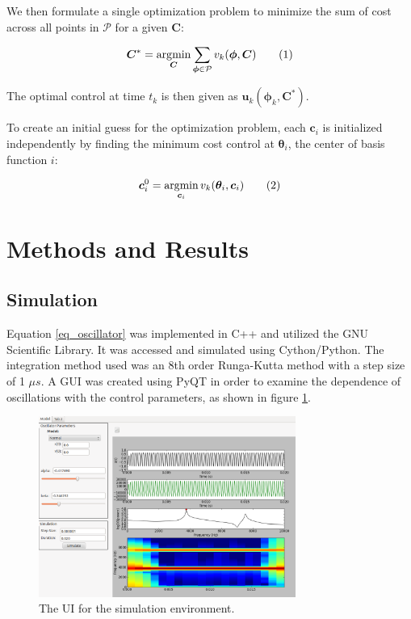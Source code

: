 \documentclass{article} %
\newcommand\numberthis{\addtocounter{equation}{1}\tag{\theequation}}
\DeclareMathOperator*{\argmin}{\arg\!\min}
\begin{document}
We then formulate a single optimization problem to minimize the sum of cost
across all points in $\mathcal{P}$ for a given $\bm{C}$:

\begin{align*}
\bm{C}^* = \argmin_{\bm{C}} \sum_{\bm{\phi} \in \mathcal{P}} v_k( \bm{\phi}, \bm{C} )  \numberthis \label{eq_cstar}
\end{align*}

The optimal control at time $t_k$ is then given as $\bm{u}_k(\bm{\phi}_k, \bm{C}^*)$.

To create an initial guess for the optimization problem, each $\bm{c}_i$ is initialized
independently by finding the minimum cost control at $\bm{\theta}_i$, the center of
basis function $i$:
   
\begin{align*}
\bm{c}_i^0 = \argmin_{\bm{c}_i} v_k( \bm{\theta}_i, \bm{c}_i )  \numberthis \label{eq_ci}
\end{align*}


\section{Methods and Results}

\subsection{Simulation}

Equation \eqref{eq_oscillator} was implemented in C++ and utilized the GNU Scientific Library. It
was accessed and simulated using Cython/Python. The integration method used was an 8th order
Runga-Kutta method \cite{JRDormand1980} with a step size of 1 $\mu s$. A GUI was created using
PyQT in order to examine the dependence of oscillations with the control parameters, as
shown in figure \ref{fig:simulation}.

\begin{figure}[h]
\centering
\includegraphics[width=0.75\textwidth]{images/simulation.png}
\caption{The UI for the simulation environment.}
\label{fig:simulation}
\end{figure}
\end{document}
